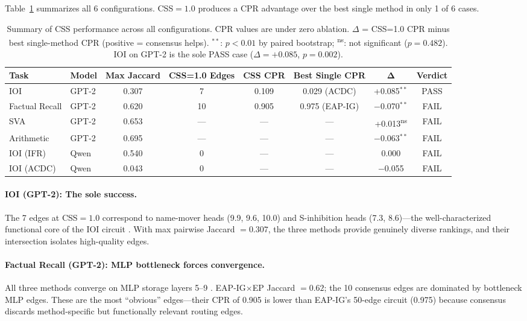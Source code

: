 \documentclass[11pt,a4paper]{article}
\newcommand{\css}{\textsc{CSS}}
\newcommand{\cpr}{\textsc{CPR}}
\begin{document}
Table~\ref{tab:main-results} summarizes all 6 configurations. \css{}$=1.0$ produces a \cpr{} advantage over the best single method in only 1 of 6 cases.

\begin{table}[t]
\centering
\small
\begin{tabular}{llcccccc}
\toprule
\textbf{Task} & \textbf{Model} & \textbf{Max Jaccard} & \textbf{CSS=1.0 Edges} & \textbf{CSS \cpr{}} & \textbf{Best Single \cpr{}} & $\boldsymbol{\Delta}$ & \textbf{Verdict} \\
\midrule
IOI        & GPT-2   & 0.307 & 7   & 0.109 & 0.029 (ACDC) & +0.085$^{**}$ & PASS \\
Factual Recall & GPT-2 & 0.620 & 10 & 0.905 & 0.975 (EAP-IG) & $-$0.070$^{**}$ & FAIL \\
SVA        & GPT-2   & 0.653 & --- & ---   & ---          & +0.013\textsuperscript{ns} & FAIL \\
Arithmetic & GPT-2   & 0.695 & --- & ---   & ---          & $-$0.063$^{**}$ & FAIL \\
IOI (IFR)  & Qwen    & 0.540 & 0   & ---   & ---          & 0.000 & FAIL \\
IOI (ACDC) & Qwen    & 0.043 & 0   & ---   & ---          & $-$0.055 & FAIL \\
\bottomrule
\end{tabular}
\caption{Summary of \css{} performance across all configurations. \cpr{} values are under zero ablation. $\Delta$ = CSS=1.0 \cpr{} minus best single-method \cpr{} (positive = consensus helps). $^{**}$: $p<0.01$ by paired bootstrap; \textsuperscript{ns}: not significant ($p=0.482$). IOI on GPT-2 is the sole PASS case ($\Delta=+0.085$, $p=0.002$).}
\label{tab:main-results}
\end{table}

\paragraph{IOI (GPT-2): The sole success.} The 7 edges at \css{}$=1.0$ correspond to name-mover heads (9.9, 9.6, 10.0) and S-inhibition heads (7.3, 8.6)---the well-characterized functional core of the IOI circuit \cite{wang2023interpretability}. With max pairwise Jaccard $= 0.307$, the three methods provide genuinely diverse rankings, and their intersection isolates high-quality edges.

\paragraph{Factual Recall (GPT-2): MLP bottleneck forces convergence.} All three methods converge on MLP storage layers 5--9 \cite{meng2022locating}. EAP-IG$\times$EP Jaccard $= 0.62$; the 10 consensus edges are dominated by bottleneck MLP edges. These are the most ``obvious'' edges---their \cpr{} of 0.905 is lower than EAP-IG's 50-edge circuit (0.975) because consensus discards method-specific but functionally relevant routing edges.
\end{document}
